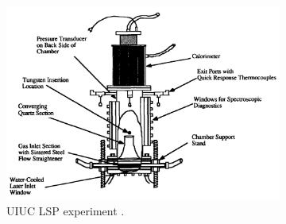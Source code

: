         \begin{figure}[h]
            \centering
            \begin{subfigure}[b]{0.55\textwidth}
                \centering
                \includegraphics[width=\textwidth]{assets/2 background/uiuc_setup2.png}
                \caption{UIUC LSP experiment \cite{krierEnergyConversionMeasurements1988}.}
                \label{fig:4_uiucLSP}
            \end{subfigure}
            \hfill
            \begin{subfigure}[b]{0.43\textwidth}
                \centering

\end{subfigure}
\end{figure}
